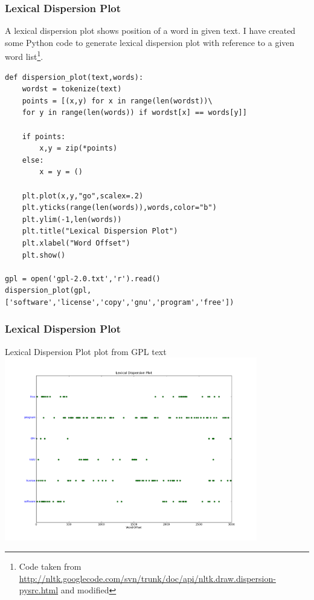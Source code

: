 \documentclass[serif,11pt,aspectratio=1610,table]{beamer}
\begin{document}
\begin{frame}[fragile]
 \frametitle{Lexical Dispersion Plot}
A lexical dispersion plot shows position of a word in given text. I have created some Python code to generate lexical dispersion plot with reference to a given word list\footnote{Code taken from \url{http://nltk.googlecode.com/svn/trunk/doc/api/nltk.draw.dispersion-pysrc.html} and modified}.
\tiny
\begin{verbatim}
def dispersion_plot(text,words):
    wordst = tokenize(text)
    points = [(x,y) for x in range(len(wordst))\
    for y in range(len(words)) if wordst[x] == words[y]]

    if points:
        x,y = zip(*points)
    else:
        x = y = ()

    plt.plot(x,y,"go",scalex=.2)
    plt.yticks(range(len(words)),words,color="b")
    plt.ylim(-1,len(words))
    plt.title("Lexical Dispersion Plot")
    plt.xlabel("Word Offset")
    plt.show()

gpl = open('gpl-2.0.txt','r').read()
dispersion_plot(gpl,['software','license','copy','gnu','program','free'])
\end{verbatim}

\end{frame}


\begin{frame}[fragile]
 \frametitle{Lexical Dispersion Plot}
\small
Lexical Dispersion Plot plot from GPL text \\
\includegraphics[height=8cm]{ld.png}
\end{frame}
\end{document}
